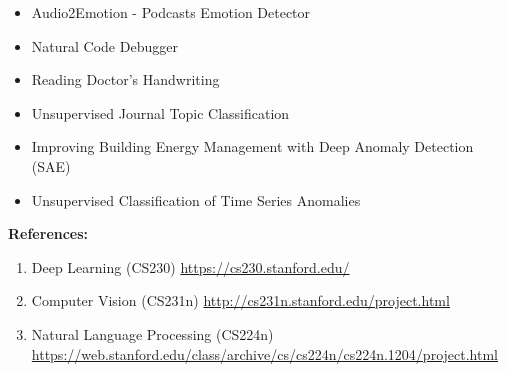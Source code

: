 \documentclass[11pt]{article}
\theoremstyle{definition}
\begin{document}
\begin{itemize}
  \item Audio2Emotion - Podcasts Emotion Detector
  \item Natural Code Debugger
  \item Reading Doctor's Handwriting
  \item Unsupervised Journal Topic Classification
  \item Improving Building Energy Management with Deep Anomaly Detection (SAE)
  \item Unsupervised Classification of Time Series Anomalies
\end{itemize}

\newpage

\textbf{References:}
\begin{enumerate}
    \item Deep Learning (CS230) \url{https://cs230.stanford.edu/}
    \item Computer Vision (CS231n) \url{http://cs231n.stanford.edu/project.html}
    \item Natural Language Processing (CS224n) \url{https://web.stanford.edu/class/archive/cs/cs224n/cs224n.1204/project.html}
\end{enumerate}
\end{document}
